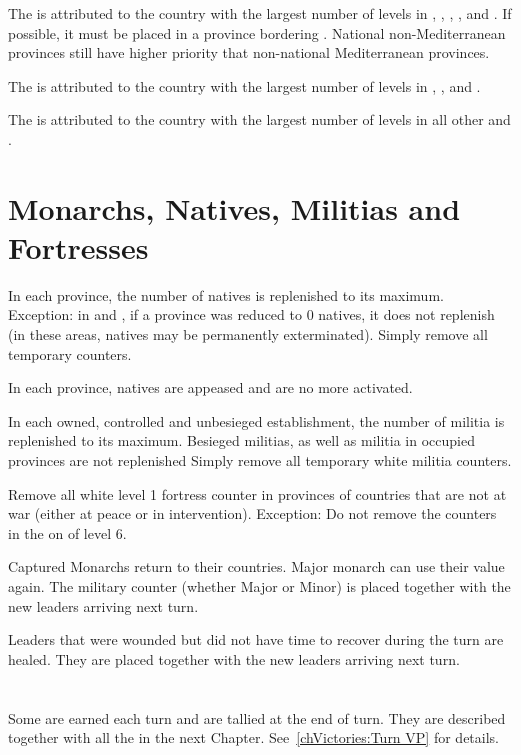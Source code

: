 \aparag[Mediterranean]
\bparag The  is attributed to the country with the largest
number of \TradeFLEET levels in , , ,
,  and .
\bparag If possible, it must be placed in a province bordering
\regionMediterrannee. National non-Mediterranean provinces still have higher
priority that non-national Mediterranean provinces.


\aparag[Indian] The  is attributed to the country with the largest
number of \TradeFLEET levels in , ,  and
.

\aparag[Atlantic] The  is attributed to the country with the
largest number of \TradeFLEET levels in all other \STZ and \CTZ.

\section{Monarchs, Natives, Militias and Fortresses}
\label{chInter:Natives, Militias, Fortresses}

\aparag[Natives] In each \ROTW province, the number of natives is replenished
to its maximum.
\bparag Exception: in \continentAmerica and \continentSiberia, if a province
was reduced to 0 natives, it does not replenish (in these areas, natives may
be permanently exterminated).
\bparag Simply remove all temporary  counters.

\aparag[Appeasement] In each \ROTW province, natives are appeased and are no
more activated.

\aparag[Militia] In each owned, controlled and unbesieged establishment, the
number of militia is replenished to its maximum.
\bparag Besieged militias, as well as militia in occupied provinces are not
replenished
\bparag Simply remove all temporary white militia counters.

\aparag[Fortresses] Remove all white level 1 fortress counter in provinces of
countries that are not at war (either at peace or in intervention).
\bparag Exception: Do not remove the counters in the \ROTW on \COL of level
6.

 Captured Monarchs return to their countries.
\bparag Major monarch can use their value again.
\bparag The military counter (whether Major or Minor) is placed together with
the new leaders arriving next turn.

 Leaders that were wounded but did not have time to
recover during the turn are healed.
\bparag They are placed together with the new leaders arriving next turn.

\section{\VPs}
\aparag Some \VPs are earned each turn and are tallied at the end of turn.
\bparag They are described together with all the \VPs in the next
Chapter. See~\ref{chVictories:Turn VP} for details.

